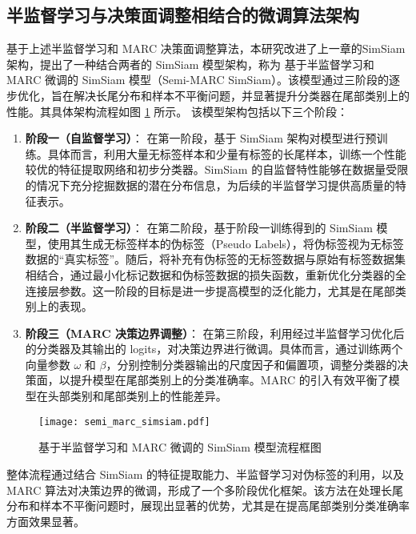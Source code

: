 \documentclass[master]{thesis-uestc}
\begin{document}
\subsection{半监督学习与决策面调整相结合的微调算法架构}

基于上述半监督学习和 MARC 决策面调整算法，本研究改进了上一章的SimSiam架构，提出了一种结合两者的 SimSiam 模型架构，称为 基于半监督学习和 MARC 微调的 SimSiam 模型（Semi-MARC SimSiam）。该模型通过三阶段的逐步优化，旨在解决长尾分布和样本不平衡问题，并显著提升分类器在尾部类别上的性能。其具体架构流程如图 \ref{semi_marc_simsiam} 所示。
该模型架构包括以下三个阶段：

\begin{enumerate}
    \item \textbf{阶段一（自监督学习）}：  
    在第一阶段，基于 SimSiam 架构对模型进行预训练。具体而言，利用大量无标签样本和少量有标签的长尾样本，训练一个性能较优的特征提取网络和初步分类器。SimSiam 的自监督特性能够在数据量受限的情况下充分挖掘数据的潜在分布信息，为后续的半监督学习提供高质量的特征表示。

    \item \textbf{阶段二（半监督学习）}：  
    在第二阶段，基于阶段一训练得到的 SimSiam 模型，使用其生成无标签样本的伪标签（Pseudo Labels），将伪标签视为无标签数据的“真实标签”。随后，将补充有伪标签的无标签数据与原始有标签数据集相结合，通过最小化标记数据和伪标签数据的损失函数，重新优化分类器的全连接层参数。这一阶段的目标是进一步提高模型的泛化能力，尤其是在尾部类别上的表现。

    \item \textbf{阶段三（MARC 决策边界调整）}：  
    在第三阶段，利用经过半监督学习优化后的分类器及其输出的 logits，对决策边界进行微调。具体而言，通过训练两个向量参数 $\omega$ 和 $\beta$，分别控制分类器输出的尺度因子和偏置项，调整分类器的决策面，以提升模型在尾部类别上的分类准确率。MARC 的引入有效平衡了模型在头部类别和尾部类别上的性能差异。
\end{enumerate}

\begin{figure}[h]
    \centering
    \texttt{[image: semi\_marc\_simsiam.pdf]}
    \caption{基于半监督学习和 MARC 微调的 SimSiam 模型流程框图}
    \label{semi_marc_simsiam}
\end{figure}

整体流程通过结合 SimSiam 的特征提取能力、半监督学习对伪标签的利用，以及 MARC 算法对决策边界的微调，形成了一个多阶段优化框架。该方法在处理长尾分布和样本不平衡问题时，展现出显著的优势，尤其是在提高尾部类别分类准确率方面效果显著。
\end{document}
